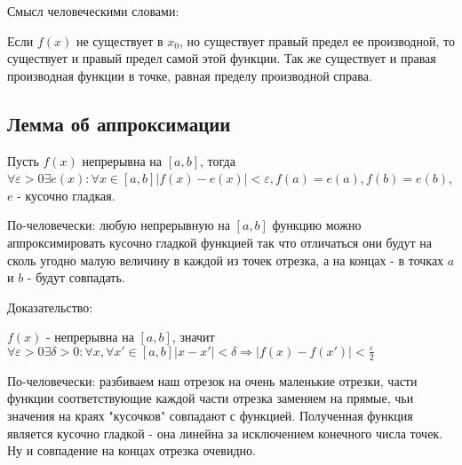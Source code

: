 Смысл человеческими словами:

Если $f(x)$ не существует в $x_0$, но существует правый предел ее производной, то существует и правый предел самой этой функции. Так же существует и правая производная функции в точке, равная пределу производной справа.

\subsection{Лемма об аппроксимации}

Пусть $f(x)$ непрерывна на $[a,b]$, тогда $\forall \varepsilon>0 \exists e(x): \forall x \in [a,b] |f(x)-e(x)|<\varepsilon, f(a)=e(a), f(b)=e(b)$, $e$ - кусочно гладкая.

По-человечески: любую непрерывную на $[a,b]$ функцию можно аппроксимировать кусочно гладкой функцией так что отличаться они будут на сколь угодно малую величину в каждой из точек отрезка, а на концах - в точках $a$ и $b$ - будут совпадать.

Доказательство:

$f(x)$ - непрерывна на $[a,b]$, значит $\forall \varepsilon >0 \exists \delta >0: \forall x, \forall x' \in [a,b] |x-x'|<\delta \Rightarrow |f(x)-f(x')|<\frac{\varepsilon}2$

По-человечески: разбиваем наш отрезок на очень маленькие отрезки, части функции соответствующие каждой части отрезка заменяем на прямые, чьи значения на краях "кусочков" совпадают с функцией. Полученная функция является кусочно гладкой - она линейна за исключением конечного числа точек. Ну и совпадение на концах отрезка очевидно.



